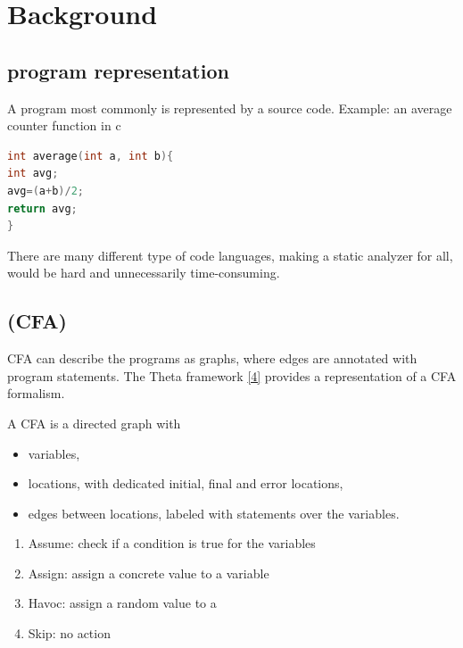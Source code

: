 \chapter{Background}
\label{sec:cfa}


\section{program representation}

A program most commonly is represented by a source code. Example: an average counter function in c

\begin{lstlisting}[language=C,breaklines=true]
int average(int a, int b){
int avg;
avg=(a+b)/2;
return avg;
}
\end{lstlisting}

There are many different type of code languages, making a static analyzer for all, would be hard and unnecessarily time-consuming. 

\section{\cfa (CFA)}
\label{sec:cfaleiras}
CFA can describe the programs as graphs, where edges are annotated with program statements. The Theta framework \hyperref[sec:ref]{[4]} provides a representation of a CFA formalism.

A CFA is a directed graph with
 
\begin{itemize}
	\item variables,
	\item locations, with dedicated initial, final and error locations,
	\item edges between locations, labeled with statements over the variables.
\end{itemize}

\begin{enumerate}
	\item Assume: check if a condition is true for the variables
	\item Assign: assign a concrete value to a variable
	\item Havoc: assign a random value to a 
	\item Skip: no action
\end{enumerate}

